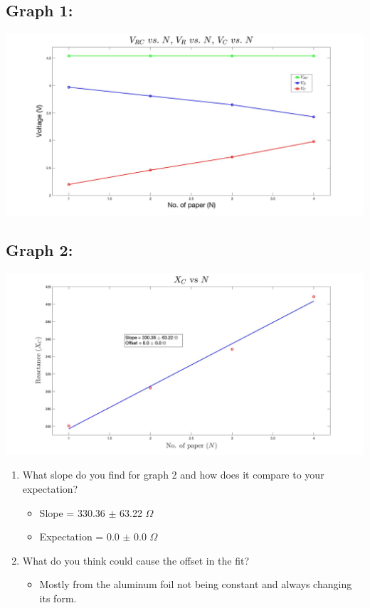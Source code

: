 \documentclass{article}
\begin{document}
\begin{center}
  \subsection*{Graph 1:}
  \includegraphics[scale=0.2]{graph1.jpg}
  \subsection*{Graph 2:}
  \includegraphics[scale=0.2]{graph2.jpg}
\end{center}
\newpage
\begin{center}
  \begin{enumerate}
    \item What slope do you find for graph 2 and how does it compare to your expectation?
    \begin{itemize}
      \item Slope = 330.36 \(\pm \) 63.22 \(\Omega \)
      \item Expectation = 0.0 \(\pm \) 0.0 \(\Omega \)
    \end{itemize}
    \item What do you think could cause the offset in the fit?
    \begin{itemize}
      \item Mostly from the aluminum foil not being constant and always changing its form.
    \end{itemize}
  \end{enumerate}
\end{center}
\end{document}
